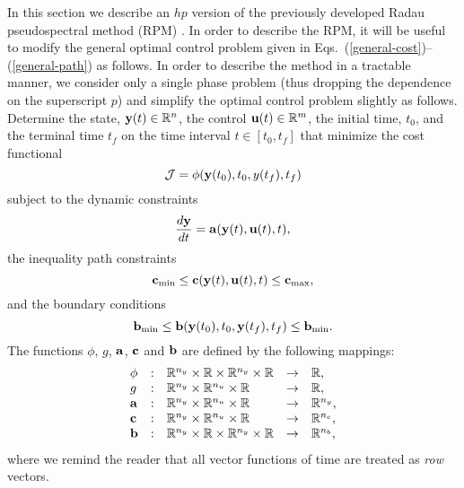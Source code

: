 \documentclass[prodmode,acmtecs]{acmsmall}
\begin{document}
In this section we describe an $hp$ version of the previously
developed Radau pseudospectral method (RPM)
\cite{Garg1,Garg2,Garg3,Patterson1}.  In order to describe the RPM,
it will be useful to modify the general optimal control problem given
in Eqs.~(\ref{general-cost})--(\ref{general-path}) as follows.  In
order to describe the method in a tractable manner, we consider only a
single phase problem (thus dropping the dependence on the superscript
$p$) and simplify the optimal control problem slightly as follows.
Determine  the state, $\mathbf{y}(t)\in\mathbb{R}^{n}$, the control
$\mathbf{u}(t)\in\mathbb{R}^{m}$, the initial time, $t_0$, and the terminal time
$t_f$ on the time interval $t\in[t_0,t_f]$ that minimize the cost
functional  
\begin{equation}\label{bolza-cost}
  \mathcal{J} = \phi(\bfy(t_0),t_0,y(t_f),t_f)
\end{equation} 
subject to the dynamic constraints
\begin{equation}\label{bolza-dyn}
  \frac{d\bfy}{dt} = \bfa(\bfy(t),\bfu(t),t), 
\end{equation} 
the inequality path constraints
\begin{equation}\label{bolza-path}
\bfc_{\min} \leq \bfc(\bfy(t),\bfu(t),t)\leq \bfc_{\max},
\end{equation} 
and the boundary conditions
\begin{equation}\label{bolza-bc}
 \bfb_{\min} \leq \bfb(\bfy(t_0),t_0,\bfy(t_f),t_f) \leq \bfb_{\min}.
\end{equation} 
The functions $\phi$, $g$, $\mathbf{a}$, $\mathbf{c}$ and $\mathbf{b}$ are defined by
the following mappings:  
\[
\begin{array}{lllll}
   \phi & : &  \mathbb{R}^{n_y} \times \mathbb{R} \times \mathbb{R}^{n_y} \times \mathbb{R} & \rightarrow & \mathbb{R}, \\
   g & : &  \mathbb{R}^{n_y} \times \mathbb{R}^{n_u} \times \mathbb{R} & \rightarrow & \mathbb{R}, \\
   \mathbf{a} & : &  \mathbb{R}^{n_y} \times \mathbb{R}^{n_u} \times \mathbb{R} & \rightarrow & \mathbb{R}^{n_y}, \\
  \mathbf{c} & : &  \mathbb{R}^{n_y} \times \mathbb{R}^{n_u} \times \mathbb{R} & \rightarrow & \mathbb{R}^{n_c}, \\
  \mathbf{b} & : &  \mathbb{R}^{n_y} \times \mathbb{R} \times \mathbb{R}^{n_y} \times \mathbb{R} & \rightarrow & \mathbb{R}^{n_b},
 \end{array}
\]
where we remind the reader that all vector functions of time are
treated as {\em row} vectors.  
\end{document}
